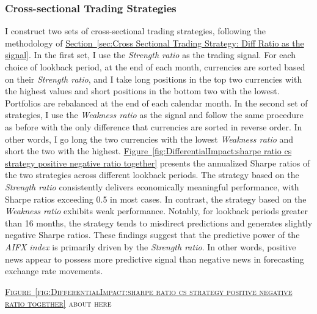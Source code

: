 \documentclass[12pt,oneside,letter]{article}
\newcommand*{\myfig}[1]{\hyperref[{#1}]{Figure~\ref*{#1}}}
\newcommand*{\mysec}[1]{\hyperref[{#1}]{Section~\ref*{#1}}}
\begin{document}
		\subsubsection{Cross-sectional Trading Strategies}			\label{sec:CS Trading Strategy: Positive and Negative Ratio as Signal}
		I construct two sets of cross-sectional trading strategies, following the methodology of \mysec{sec:Cross Sectional Trading Strategy: Diff Ratio as the signal}. In the first set, I use the \textit{Strength ratio} as the trading signal. For each choice of lookback period, at the end of each month, currencies are sorted based on their \textit{Strength ratio}, and I take long positions in the top two currencies with the highest values and short positions in the bottom two with the lowest. Portfolios are rebalanced at the end of each calendar month. In the second set of strategies, I use the \textit{Weakness ratio} as the signal and follow the same procedure as before with the only difference that currencies are sorted in reverse order. In other words, I go long the two currencies with the lowest \textit{Weakness ratio} and short the two with the highest. \myfig{fig:DifferentialImpact:sharpe ratio cs strategy positive negative ratio together} presents the annualized Sharpe ratios of the two strategies across different lookback periods. The strategy based on the \textit{Strength ratio} consistently delivers economically meaningful performance, with Sharpe ratios exceeding 0.5 in most cases. In contrast, the strategy based on the \textit{Weakness ratio} exhibits weak performance. Notably, for lookback periods greater than 16 months, the strategy tends to misdirect predictions and generates slightly negative Sharpe ratios. These findings suggest that the predictive power of the \textit{AIFX index} is primarily driven by the \textit{Strength ratio}. In other words, positive news appear to possess more predictive signal than negative news in forecasting exchange rate movements.
		\begin{center}
			\textsc{\myfig{fig:DifferentialImpact:sharpe ratio cs strategy positive negative ratio together} about here} \vspace{0cm}
		\end{center} 
\end{document}

